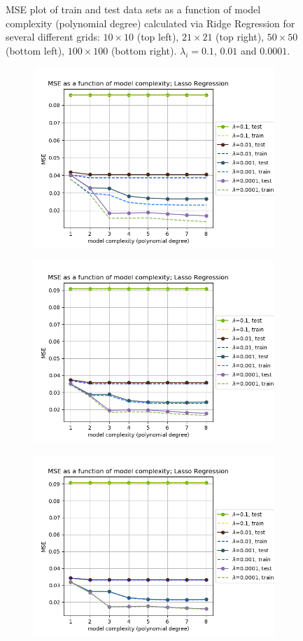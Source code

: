 \begin{figure}[!ht]
\begin{subfigure}{\textwidth}
\end{subfigure}
\caption{MSE plot of train and test data sets as a function of model complexity (polynomial degree) calculated via Ridge Regression for several different grids: $10\times10$ (top left), $21\times21$ (top right), $50\times50$ (bottom left), $100\times100$ (bottom right). $\lambda_i = 0.1$, $0.01$ and $0.0001$.}
\label{fig:ridge-mse}
\end{figure}

\begin{figure}[!ht]
\begin{subfigure}{\textwidth}
  \centering
  \includegraphics[width=0.55\linewidth]{images/mse/fake_lasso_mse_p08_n10.png}
\end{subfigure}
\begin{subfigure}{\textwidth}
  \centering
  \includegraphics[width=0.55\linewidth]{images/mse/fake_lasso_mse_p08_n21.png}
\end{subfigure}
\begin{subfigure}{\textwidth}
  \centering
  \includegraphics[width=0.55\linewidth]{images/mse/fake_lasso_mse_p08_n50.png}

\end{subfigure}
\end{figure}
